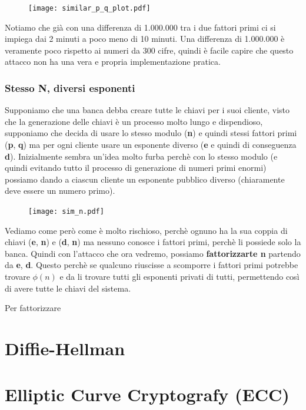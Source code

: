 \documentclass{rapport}
\begin{document}
\begin{figure}[h]
    \centering
    \texttt{[image: similar\_p\_q\_plot.pdf]}
\end{figure}

Notiamo che già con una differenza di 1.000.000 tra i due fattori primi ci si impiega dai 2 minuti a poco meno di 10 minuti. Una differenza di 1.000.000 è veramente poco rispetto ai numeri da 300 cifre, quindi è facile capire che questo attacco non ha una vera e propria implementazione pratica. 


\subsubsection{Stesso N, diversi esponenti}
Supponiamo che una banca debba creare tutte le chiavi per i suoi cliente, visto che la generazione delle chiavi è un processo molto lungo e dispendioso, supponiamo che decida di usare lo stesso modulo (\textbf{n}) e quindi stessi fattori primi (\textbf{p}, \textbf{q}) ma per ogni cliente usare un esponente diverso (\textbf{e} e quindi di conseguenza \textbf{d}). Inizialmente sembra un'idea molto furba perchè con lo stesso modulo (e quindi evitando tutto il processo di generazione di numeri primi enormi) possiamo dando a ciascun cliente un esponente pubblico diverso (chiaramente deve essere un numero primo). 



\begin{figure}[h]
    \centering
    \texttt{[image: sim\_n.pdf]}
\end{figure}


Vediamo come però come è molto rischioso, perchè ognuno ha la sua coppia di chiavi (\textbf{e}, \textbf{n}) e (\textbf{d}, \textbf{n}) ma nessuno conosce i fattori primi, perchè li possiede solo la banca. Quindi con l'attacco che ora vedremo, possiamo \textbf{fattorizzarte n} partendo da \textbf{e}, \textbf{d}. Questo perchè se qualcuno riuscisse a scomporre i fattori primi potrebbe trovare \textbf{$\phi(n)$} e da li trovare tutti gli esponenti privati di tutti, permettendo così di avere tutte le chiavi del sistema.

Per fattorizzare 




\section{Diffie-Hellman}


\section{Elliptic Curve Cryptografy (ECC)}
\end{document}
